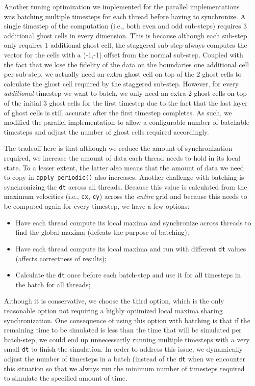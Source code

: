 Another tuning optimization we implemented for the parallel
implementations was batching multiple timesteps for each thread before
having to synchronize. A single timestep of the computation (i.e., both
even and odd sub-steps) requires 3 additional ghost cells in every
dimension. This is because although each sub-step only requires 1
additional ghost cell, the staggered sub-step always computes the vector
for the cells with a (-1,-1) offset from the normal sub-step. Coupled
with the fact that we lose the fidelity of the data on the boundaries one
additional cell per sub-step, we actually need an extra ghost cell on top
of the 2 ghost cells to calculate the ghost cell required by the
staggered sub-step. However, for every \emph{additional} timestep we want
to batch, we only need an extra 2 ghost cells on top of the initial 3
ghost cells for the first timestep due to the fact that the last layer of
ghost cells is still accurate after the first timestep completes. As
such, we modified the parallel implementation to allow a configurable
number of batchable timesteps and adjust the number of ghost cells
required accordingly.

The tradeoff here is that although we reduce the amount of
synchronization required, we increase the amount of data each thread
needs to hold in its local state. To a lesser extent, the latter also
means that the amount of data we need to copy in
\texttt{apply\_periodic()} also increases. Another challenge with batching
is synchronizing the \texttt{dt} across all threads. Because this value
is calculated from the maximum velocities (i.e., \texttt{cx},
\texttt{cy}) across the \emph{entire} grid and because this needs to be
computed again for every timestep, we have a few options:

\begin{itemize}
  \item Have each thread compute its local maxima and synchronize across
    threads to find the global maxima (defeats the purpose of batching);
  \item Have each thread compute its local maxima and run with different
    \texttt{dt} values (affects correctness of results);
  \item Calculate the \texttt{dt} once before each batch-step and use it
    for all timesteps in the batch for all threads;
\end{itemize}

Although it is conservative, we choose the third option, which is the
only reasonable option not requiring a highly optimized local maxima
sharing synchronization. One consequence of using this option with
batching is that if the remaining time to be simulated is less than the
time that will be simulated per batch-step, we could end up unnecessarily
running multiple timesteps with a very small \texttt{dt} to finish the
simulation. In order to address this issue, we dynamically adjust the
number of timesteps in a batch (instead of the \texttt{dt} when we
encounter this situation so that we always run the minimum number of
timesteps required to simulate the specified amount of time.

